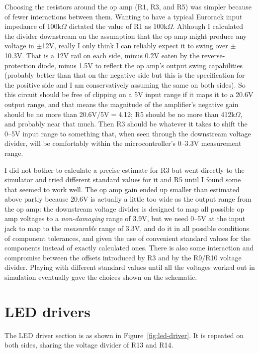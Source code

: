 Choosing the resistors around the op amp (R1, R3, and R5) was simpler
because of fewer interactions between them.  Wanting to have a typical
Eurorack input impedance of 100k$\Omega$ dictated the value of R1 as
100k$\Omega$.  Although I calculated the divider downstream on the
assumption that the op amp might produce any voltage in $\pm$12V, really I
only think I can reliably expect it to swing over $\pm$10.3V.  That is a 12V
rail on each side, minus 0.2V eaten by the reverse-protection diode,
minus 1.5V to reflect the op amp's output swing capabilities (probably
better than that on the negative side but this is the specification for the
positive side and I am conservatively assuming the same on both sides).  So
this circuit should be free of clipping on a 5V input range if it maps it to
a 20.6V output range, and that means the magnitude of the amplifier's
negative gain should be no more than 20.6V$/$5V$=$4.12; R5 should be no more
than 412k$\Omega$, and probably near that much.  Then R3 should be whatever
it takes to shift the 0--5V input range to something that, when seen through
the downstream voltage divider, will be comfortably within the
microcontroller's 0--3.3V measurement range.

I did not bother to calculate a precise estimate for R3 but went directly to
the simulator and tried different standard values for it and R5 until I
found some that seemed to work well.  The op amp gain ended up smaller than
estimated above partly because 20.6V is actually a little too wide as the
output range from the op amp: the downstream voltage divider is designed to
map all possible op amp voltages to a \emph{non-damaging} range of 3.9V, but
we need 0--5V at the input jack to map to the \emph{measurable} range of
3.3V, and do it in all possible conditions of component tolerances, and
given the use of convenient standard values for the components instead of
exactly calculated ones.  There is also some interaction and compromise
between the offsets introduced by R3 and by the R9/R10 voltage divider. 
Playing with different standard values until all the voltages worked out in
simulation eventually gave the choices shown on the schematic.

\section{LED drivers}

The LED driver section is as shown in Figure~\ref{fig:led-driver}.  It is
repeated on both sides, sharing the voltage divider of R13 and R14.

